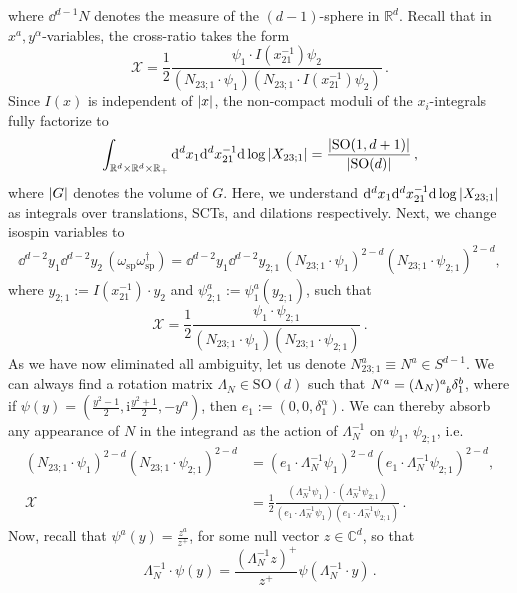 \documentclass{article}
\def \om {\omega}
\def \dg {\delta}
\def \ag {\alpha}
\def \La {\Lambda}
\def \Rs {\mathbb{R}}
\def \Cs {\mathbb{C}}
\begin{document}
where $\dd^{d-1} N$ denotes the measure of the $(d-1)$-sphere in $\Rs^d$. Recall that in $x^a,y^{\ag}$-variables, the cross-ratio takes the form
\begin{equation}
\mathcal{X} = \frac{1}{2} \frac{\psi_1 \cdot I(x_{21}^{-1}) \psi_2}{(N_{23;1} \cdot \psi_1)(N_{23;1} \cdot I(x_{21}^{-1}) \psi_2)}\,. 
\end{equation}
Since $I(x)$ is independent of $\abs{x}$, the non-compact moduli of the $x_i$-integrals fully factorize to
\begin{equation}
\int_{\Rs^d \times \Rs^d \times \Rs_+} \dd^d x_1 \dd^d x_{21}^{-1} \dd \log \abs{X_{23;1}} =\frac{\abs{\mathrm{SO}(1,d+1)}}{\abs{\mathrm{SO}(d)}}\,, 
\end{equation}
where $\abs{G}$ denotes the volume of $G$. 
Here, we understand $\dd^d x_1 \dd^d x_{21}^{-1} \dd \log \abs{X_{23;1}} $ as integrals over translations, SCTs, and dilations respectively. Next, we change isospin variables to 
\begin{align*}
\dd^{d-2} y_1 \dd^{d-2}y_2 \, (\om_{\mathrm{sp}}  \om^{\dagger}_{\mathrm{sp}}) = \dd^{d-2} y_1  \dd^{d-2} y_{2;1} \,  (N_{23;1} \cdot \psi_1)^{2-d} (N_{23;1} \cdot \psi_{2;1})^{2-d},
\end{align*}
where $y_{2;1} := I(x_{21}^{-1}) \cdot y_2$ and $\psi_{2;1}^a := \psi^a_1(y_{2;1})$, such that 
\begin{equation}
\mathcal{X} = \frac{1}{2} \frac{\psi_1 \cdot \psi_{2;1}}{(N_{23;1} \cdot \psi_1) (N_{23;1} \cdot \psi_{2;1})}\,.
\end{equation}
As we have now eliminated all ambiguity, let us denote $N^a_{23;1} \equiv N^a \in S^{d-1}$. We can always find a rotation matrix $\La_N \in \mathrm{SO}(d)$ such that $N^a = \tensor{(\La_N)}{^a_b} \dg^b_1$, where if $\psi(y)=\left(\frac{y^2-1}{2}, \mathrm{i} \frac{y^2+1}{2},-y^{\ag}  \right)$, then $e_1 := (0,0,\dg^{\ag}_1)$. We can thereby absorb any appearance of $N$ in the integrand as the action of $\La_N^{-1}$ on $\psi_1$, $\psi_{2;1}$, i.e.
\begin{align*}
 (N_{23;1} \cdot \psi_1)^{2-d} (N_{23;1} \cdot \psi_{2;1})^{2-d} &= (e_1 \cdot \La_N^{-1} \psi_1 )^{2-d} (e_1 \cdot \La_N^{-1} \psi_{2;1} )^{2-d} , \\
\mathcal{X} &= \frac{1}{2} \frac{(\La_N^{-1} \psi_1) \cdot (\La_N^{-1} \psi_{2;1})}{ (e_1 \cdot \La_N^{-1} \psi_1 ) (e_1 \cdot \La_N^{-1} \psi_{2;1})}\,.
\end{align*}
Now, recall that $\psi^a(y) = \frac{z^a}{z^+}$, for some null vector $z \in \Cs^d$, so that 
\begin{equation}
\La_N^{-1} \cdot  \psi(y) = \frac{(\La_N^{-1} z)^+}{z^+} \psi (\La_N^{-1} \cdot y)\,.
\end{equation}
\end{document}
